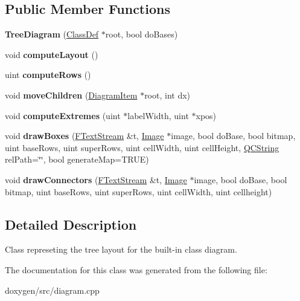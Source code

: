 \subsection*{Public Member Functions}
\begin{DoxyCompactItemize}
\item 
\mbox{\label{class_tree_diagram_ad735ca99aceef0ccf0cfbcb761dbcc84}} 
{\bfseries Tree\+Diagram} (\mbox{\hyperlink{class_class_def}{Class\+Def}} $\ast$root, bool do\+Bases)
\item 
\mbox{\label{class_tree_diagram_a940a3aaf1985a9f2ff19dc95aa91716b}} 
void {\bfseries compute\+Layout} ()
\item 
\mbox{\label{class_tree_diagram_a5012275fc688c77e729ad40ebf666582}} 
uint {\bfseries compute\+Rows} ()
\item 
\mbox{\label{class_tree_diagram_a80bd153a4b94ab9513d9d957b9953b1c}} 
void {\bfseries move\+Children} (\mbox{\hyperlink{class_diagram_item}{Diagram\+Item}} $\ast$root, int dx)
\item 
\mbox{\label{class_tree_diagram_af73eec062500230c3fafe7095192d088}} 
void {\bfseries compute\+Extremes} (uint $\ast$label\+Width, uint $\ast$xpos)
\item 
\mbox{\label{class_tree_diagram_afb5cfc60c8521a8db37b6f408b9dee95}} 
void {\bfseries draw\+Boxes} (\mbox{\hyperlink{class_f_text_stream}{F\+Text\+Stream}} \&t, \mbox{\hyperlink{class_image}{Image}} $\ast$image, bool do\+Base, bool bitmap, uint base\+Rows, uint super\+Rows, uint cell\+Width, uint cell\+Height, \mbox{\hyperlink{class_q_c_string}{Q\+C\+String}} rel\+Path=\char`\"{}\char`\"{}, bool generate\+Map=T\+R\+UE)
\item 
\mbox{\label{class_tree_diagram_afcb546f45e7cc4c69a8ce574ec518292}} 
void {\bfseries draw\+Connectors} (\mbox{\hyperlink{class_f_text_stream}{F\+Text\+Stream}} \&t, \mbox{\hyperlink{class_image}{Image}} $\ast$image, bool do\+Base, bool bitmap, uint base\+Rows, uint super\+Rows, uint cell\+Width, uint cellheight)
\end{DoxyCompactItemize}


\subsection{Detailed Description}
Class represeting the tree layout for the built-\/in class diagram. 

The documentation for this class was generated from the following file\+:\begin{DoxyCompactItemize}
\item 
doxygen/src/diagram.\+cpp\end{DoxyCompactItemize}
